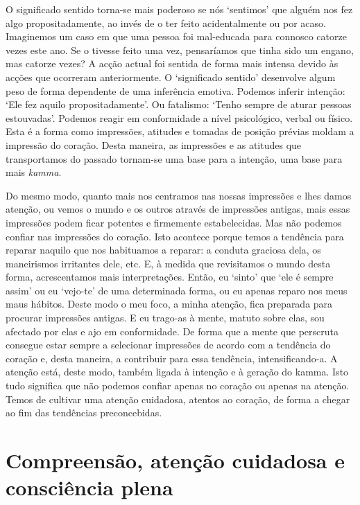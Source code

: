 O significado sentido torna-se mais poderoso se nós `sentimos' que alguém nos
fez algo propositadamente, ao invés de o ter feito acidentalmente ou por acaso.
Imaginemos um caso em que uma pessoa foi mal-educada para connosco catorze vezes
este ano. Se o tivesse feito uma vez, pensaríamos que tinha sido um engano, mas
catorze vezes? A acção actual foi sentida de forma mais intensa devido às acções
que ocorreram anteriormente. O `significado sentido' desenvolve algum peso de
forma dependente de uma inferência emotiva. Podemos inferir intenção: `Ele fez
aquilo propositadamente'. Ou fatalismo: `Tenho sempre de aturar pessoas
estouvadas'. Podemos reagir em conformidade a nível psicológico, verbal ou
físico. Esta é a forma como impressões, atitudes e tomadas de posição prévias
moldam a impressão do coração. Desta maneira, as impressões e as atitudes que
transportamos do passado tornam-se uma base para a intenção, uma base para mais
\emph{kamma}.

Do mesmo modo, quanto mais nos centramos nas nossas impressões e lhes damos
atenção, ou vemos o mundo e os outros através de impressões antigas, mais essas
impressões podem ficar potentes e firmemente estabelecidas. Mas não podemos
confiar nas impressões do coração. Isto acontece porque temos a tendência para
reparar naquilo que nos habituamos a reparar: a conduta graciosa dela, os
maneirismos irritantes dele, etc. E, à medida que revisitamos o mundo desta
forma, acrescentamos mais interpretações. Então, eu `sinto' que `ele é sempre
assim' ou eu `vejo-te' de uma determinada forma, ou eu apenas reparo nos meus
maus hábitos. Deste modo o meu foco, a minha atenção, fica preparada para
procurar impressões antigas. E eu trago-as à mente, matuto sobre elas, sou
afectado por elas e ajo em conformidade. De forma que a mente que perscruta
consegue estar sempre a selecionar impressões de acordo com a tendência do
coração e, desta maneira, a contribuir para essa tendência, intensificando-a. A
atenção está, deste modo, também ligada à intenção e à geração do kamma. Isto
tudo significa que não podemos confiar apenas no coração ou apenas na atenção.
Temos de cultivar uma atenção cuidadosa, atentos ao coração, de forma a chegar
ao fim das tendências preconcebidas.

\section{Compreensão, atenção cuidadosa e consciência plena}

